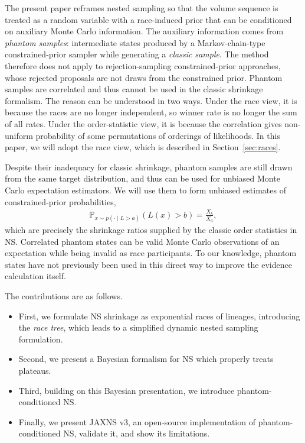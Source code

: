 \documentclass[pdflatex,sn-basic,icol]{sn-jnl}
\newcommand{\Prob}{\mathbb{P}}
\theoremstyle{plain}
\theoremstyle{definition}
\begin{document}
The present paper reframes nested sampling so that the volume sequence is treated as a random variable with a race-induced prior that can be conditioned on auxiliary Monte Carlo information.
The auxiliary information comes from \textit{phantom samples}: intermediate states produced by a Markov-chain-type constrained-prior sampler while generating a \textit{classic sample}.
The method therefore does not apply to rejection-sampling constrained-prior approaches, whose rejected proposals are not draws from the constrained prior.
Phantom samples are correlated and thus cannot be used in the classic shrinkage formalism.
The reason can be understood in two ways.
Under the race view, it is because the races are no longer independent, so winner rate is no longer the sum of all rates.
Under the order-statistic view, it is because the correlation gives non-uniform probability of some permutations of orderings of likelihoods.
In this paper, we will adopt the race view, which is described in Section~\ref{sec:races}.

Despite their inadequacy for classic shrinkage, phantom samples are still drawn from the same target distribution, and thus can be used for unbiased Monte Carlo expectation estimators.
We will use them to form unbiased estimates of constrained-prior probabilities,
\begin{align}
    \Prob_{x\sim p(\cdot\mid L>a)}(L(x)>b)=\frac{X_b}{X_a},\label{eq:intro_phantom_identity}
\end{align}
which are precisely the shrinkage ratios supplied by the classic order statistics in NS.
Correlated phantom states can be valid Monte Carlo observations of an expectation while being invalid as race participants.
To our knowledge, phantom states have not previously been used in this direct way to improve the evidence calculation itself.

The contributions are as follows.
\begin{itemize}
    \item First, we formulate NS shrinkage as exponential races of lineages, introducing the \textit{race tree}, which leads to a simplified dynamic nested sampling formulation.
    \item Second, we present a Bayesian formalism for NS which properly treats plateaus.
    \item Third, building on this Bayesian presentation, we introduce phantom-conditioned NS.
    \item Finally, we present JAXNS v3, an open-source implementation of phantom-conditioned NS, validate it, and show its limitations.
\end{itemize}
\end{document}
